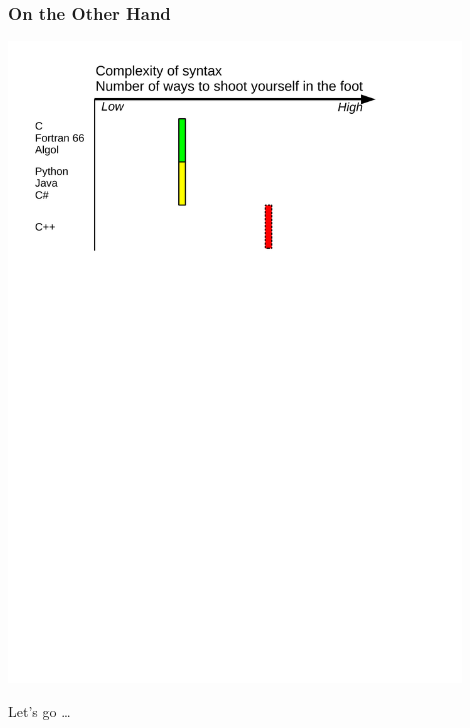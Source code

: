 \documentclass{slides}
\begin{document}
\begin{frame}
  \frametitle{On the Other Hand}
  \centering
  \includegraphics[width=0.9\textwidth]{complexity}
\end{frame}

\begin{frame}
  \vfill
  \centering
  \Huge Let's go \dots
  \vfill
\end{frame}
\end{document}
